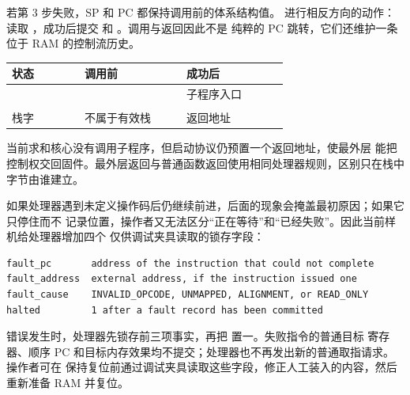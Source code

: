 若第 3 步失败，SP 和 PC 都保持调用前的体系结构值。 进行相反方向的动作：读取
，成功后提交  和 。调用与返回因此不是
纯粹的 PC 跳转，它们还维护一条位于 RAM 的控制流历史。

\begin{longtable}{|L{0.20\linewidth}|L{0.29\linewidth}|L{0.29\linewidth}|}
\hline
{}
状态 & 调用前 &  成功后 \\ \hline
{} &  & 子程序入口  \\ \hline
{} &  &  \\ \hline
栈字  & 不属于有效栈 & 返回地址  \\ \hline
\end{longtable}

当前求和核心没有调用子程序，但启动协议仍预置一个返回地址，使最外层  能把
控制权交回固件。最外层返回与普通函数返回使用相同处理器规则，区别只在栈中字节由谁建立。


如果处理器遇到未定义操作码后仍继续前进，后面的现象会掩盖最初原因；如果它只停住而不
记录位置，操作者又无法区分“正在等待”和“已经失败”。因此当前样机给处理器增加四个
仅供调试夹具读取的锁存字段：

\begin{lstlisting}
fault_pc       address of the instruction that could not complete
fault_address  external address, if the instruction issued one
fault_cause    INVALID_OPCODE, UNMAPPED, ALIGNMENT, or READ_ONLY
halted         1 after a fault record has been committed
\end{lstlisting}

错误发生时，处理器先锁存前三项事实，再把  置一。失败指令的普通目标
寄存器、顺序 PC 和目标内存效果均不提交；处理器也不再发出新的普通取指请求。操作者可在
保持复位前通过调试夹具读取这些字段，修正人工装入的内容，然后重新准备 RAM 并复位。

\begin{center}
\end{center}


